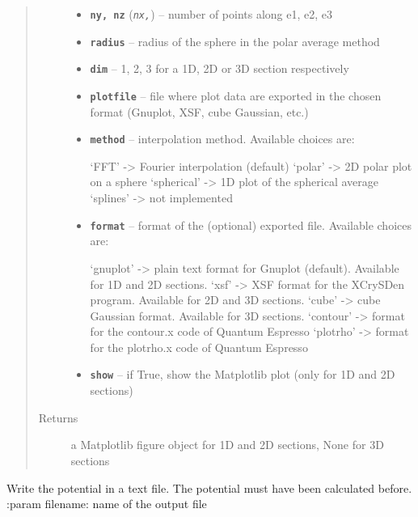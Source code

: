 \documentclass[letterpaper,10pt,english]{sphinxmanual}
\begin{document}
\begin{fulllineitems}
\begin{fulllineitems}
\begin{quote}
\begin{description}
\begin{itemize}
\item {} 
\textbf{\texttt{ny, nz}} (\emph{\texttt{nx,}}) -- number of points along e1, e2, e3

\item {} 
\textbf{\texttt{radius}} -- radius of the sphere in the polar average method

\item {} 
\textbf{\texttt{dim}} -- 1, 2, 3 for a 1D, 2D or 3D section respectively

\item {} 
\textbf{\texttt{plotfile}} -- file where plot data are exported in the chosen format (Gnuplot, XSF, cube Gaussian, etc.)

\item {} 
\textbf{\texttt{method}} -- 
interpolation method. Available choices are:

`FFT' -\textgreater{} Fourier interpolation (default)
`polar' -\textgreater{} 2D polar plot on a sphere
`spherical' -\textgreater{} 1D plot of the spherical average
`splines' -\textgreater{} not implemented


\item {} 
\textbf{\texttt{format}} -- 
format of the (optional) exported file. Available choices are:

`gnuplot' -\textgreater{} plain text format for Gnuplot (default). Available for 1D and 2D sections.
`xsf' -\textgreater{} XSF format for the XCrySDen program. Available for 2D and 3D sections.
`cube' -\textgreater{} cube Gaussian format. Available for 3D sections.
`contour' -\textgreater{} format for the contour.x code of Quantum Espresso
`plotrho' -\textgreater{} format for the plotrho.x code of Quantum Espresso


\item {} 
\textbf{\texttt{show}} -- if True, show the Matplotlib plot (only for 1D and 2D sections)

\end{itemize}

\item[{Returns}] \leavevmode
a Matplotlib figure object for 1D and 2D sections, None for 3D sections

\end{description}\end{quote}

\end{fulllineitems}


\begin{fulllineitems}
\label{postqe:postqe.charge.Potential.write}
Write the potential in a text file. The potential must have been calculated before.
:param filename: name of the output file

\end{fulllineitems}


\end{fulllineitems}
\end{document}
